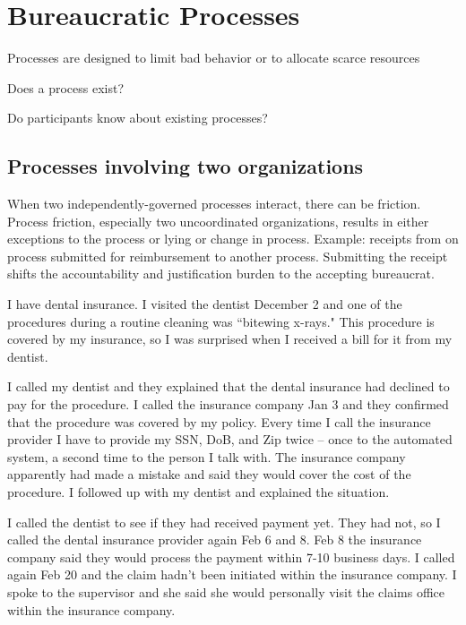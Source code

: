 \section{Bureaucratic Processes}

Processes are designed to limit bad behavior or to allocate scarce resources

Does a process exist?



Do participants know about existing processes?

\subsection{Processes involving two organizations}

When two independently-governed processes interact, there can be friction. Process friction, especially two uncoordinated organizations, results in either exceptions to the process or lying or change in process. 
Example: receipts from on process submitted for reimbursement to another process.
Submitting the receipt shifts the accountability and justification burden to the accepting bureaucrat.


I have dental insurance. I visited the dentist December 2 and one of the procedures during a routine cleaning was ``bitewing x-rays." This procedure is covered by my insurance, so I was surprised when I received a bill for it from my dentist.

I called my dentist and they explained that the dental insurance had declined to pay for the procedure. I called the insurance company Jan 3 and they confirmed that the procedure was covered by my policy. 
Every time I call the insurance provider I have to provide my SSN, DoB, and Zip twice -- once to the automated system, a second time to the person I talk with. The insurance company apparently had made a mistake and said they would cover the cost of the procedure. I followed up with my dentist and explained the situation.

I called the dentist to see if they had received payment yet. They had not, so I called the dental insurance provider again Feb 6 and 8. Feb 8 the insurance company said they would process the payment within 7-10 business days. I called again Feb 20 and the claim hadn't been initiated within the insurance company. I spoke to the supervisor and she said she would personally visit the claims office within the insurance company.

